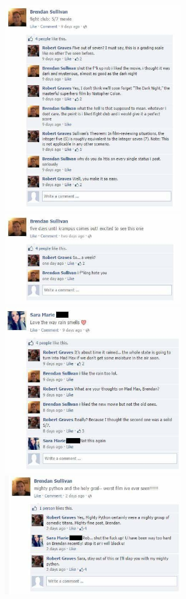 \documentclass{42-en}
\begin{document}
	\includegraphics[width=8cm]{bren5.jpg}
	\includegraphics[width=8cm]{bren6.jpg}
	\includegraphics[width=8cm]{bren7.jpg}
	\includegraphics[width=8cm]{bren8.jpg}
\end{document}
